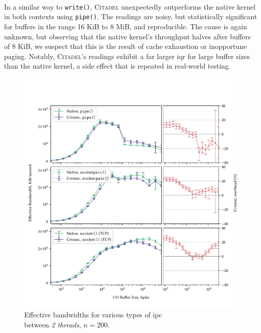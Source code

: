 \paragraph{} In a similar way to \texttt{write()}, \textsc{Citadel} unexpectedly outperforms the native kernel in both contexts using \texttt{pipe()}. The readings are noisy, but statistically significant for buffers in the range 16 KiB to 8 MiB, and reproducible. The cause is again unknown, but observing that the native kernel's throughput halves after buffers of 8 KiB, we suspect that this is the result of cache exhaustion or inopportune paging. Notably, \textsc{Citadel}'s readings exhibit a far larger \acrshort{iqr} for large buffer sizes than the native kernel, a side effect that is repeated in real-world testing.

\begin{figure}[]
    \centering
    \includegraphics[width=\linewidth]{figures/graphs/ipc-2thread.pdf}
    \vspace{-5mm}
    \captionsetup{justification=centering}
    \caption[Effective bandwidths for various types of IPC between \textit{2 threads}.]{Effective bandwidths for various types of \acrshort{ipc} \\ between \textit{2 threads}, $n=200$.}
    \label{fig:ipc-2thread-graph}
\end{figure}


